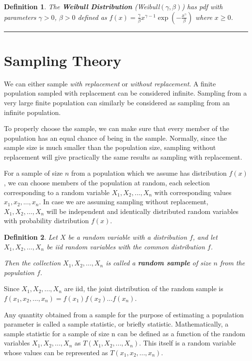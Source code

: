 \documentclass[14pt,twoside]{extreport}
\newcommand{\hhrule}{\vspace{1cm}\hrule\vspace{1cm}}
\theoremstyle{dotless}
\newtheorem*{defn}{\footnotesize Definition}
\begin{document}
\begin{defn}
    The \textbf{Weibull Distribution} (Weibull$(\gamma, \beta)$) has pdf with parameters $\gamma > 0$, $\beta > 0$ defined as  $f(x) = \frac{\gamma}{\beta} x^{\gamma - 1} \exp(- \frac{x^\gamma}{\beta})$ where $x \geq 0$.
\end{defn}

\hhrule

\section*{Sampling Theory}
We can either sample \textit{with replacement} or \textit{without replacement}. A finite population sampled with replacement can be considered infinite. Sampling from a very large finite population can similarly be considered as sampling from an infinite population. 

To properly choose the sample, we can make sure that every member of the population has an equal chance of being in the sample.
Normally, since the sample size is much smaller than the population size, sampling without replacement will give practically the same results as sampling with replacement.

For a sample of size $n$ from a population which we assume has distribution $f(x)$, we can choose members of the population at random, each selection corresponding to a random variable $X_1, X_2, ..., X_n$ with corresponding values $x_1, x_2, ..., x_n$. In case we are assuming sampling without replacement, $X_1, X_2, ..., X_n$ will be independent and identically distributed random variables with probability distribution $f(x)$.

\begin{defn}
Let $X$ be a random variable with a distribution $f$, and let $X_1, X_2, ..., X_n$ be iid random variables with the common distribution $f$.

Then the collection $X_1, X_2, ..., X_n$ is called a \textbf{random sample} of size $n$ from the population $f$.
\end{defn}

Since $X_1, X_2, ..., X_n$ are iid, the joint distribution of the random sample is \\
$f(x_1, x_2, ..., x_n) = f(x_1) f(x_2) ... f(x_n)$.

Any quantity obtained from a sample for the purpose of estimating a population parameter is called a sample
statistic, or briefly statistic. Mathematically, a sample statistic for a sample of size n can be defined as a function of the random variables $X_1, X_2, ..., X_n$ as $T(X_1, X_2, ..., X_n)$. This itself is a random variable whose values can be represented as $T(x_1, x_2, ..., x_n)$.
\end{document}
